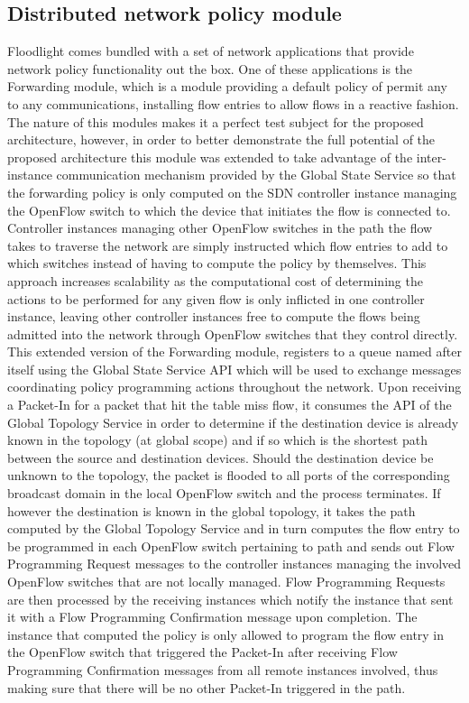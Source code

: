 \subsection{Distributed network policy module}
\label{subsection:poc-application}
%
Floodlight comes bundled with a set of network applications that provide network policy functionality out the box.
One of these applications is the Forwarding module, which is a module providing a default policy of permit any to any communications, installing flow entries to allow flows in a reactive fashion\cite{FLFwd}.\\
The nature of this modules makes it a perfect test subject for the proposed architecture, however, in order to better demonstrate the full potential of the proposed architecture this module was extended to take advantage of the inter-instance communication mechanism provided by the Global State Service so that the forwarding policy is only computed on the \gls{SDN} controller instance managing the OpenFlow switch to which the device that initiates the flow is connected to. Controller instances managing other OpenFlow switches in the path the flow takes to traverse the network are simply instructed which flow entries to add to which switches instead of having to compute the policy by themselves.
This approach increases scalability as the computational cost of determining the actions to be performed for any given flow is only inflicted in one controller instance, leaving other controller instances free to compute the flows being admitted into the network through OpenFlow switches that they control directly.\\
This extended version of the Forwarding module, registers to a queue named after itself using the Global State Service \gls{API} which will be used to exchange messages coordinating policy programming actions throughout the network.
Upon receiving a Packet-In for a packet that hit the table miss flow, it consumes the \gls{API} of the Global Topology Service in order to determine if the destination device is already known in the topology (at global scope) and if so which is the shortest path between the source and destination devices.
Should the destination device be unknown to the topology, the packet is flooded to all ports of the corresponding broadcast domain in the local OpenFlow switch and the process terminates.
If however the destination is known in the global topology, it takes the path computed by the Global Topology Service and in turn computes the flow entry to be programmed in each OpenFlow switch pertaining to path and sends out Flow Programming Request messages to the controller instances managing the involved OpenFlow switches that are not locally managed.
Flow Programming Requests are then processed by the receiving instances which notify the instance that sent it with a Flow Programming Confirmation message upon completion.
The instance that computed the policy is only allowed to program the flow entry in the OpenFlow switch that triggered the Packet-In after receiving Flow Programming Confirmation messages from all remote instances involved, thus making sure that there will be no other Packet-In triggered in the path.
%
%
